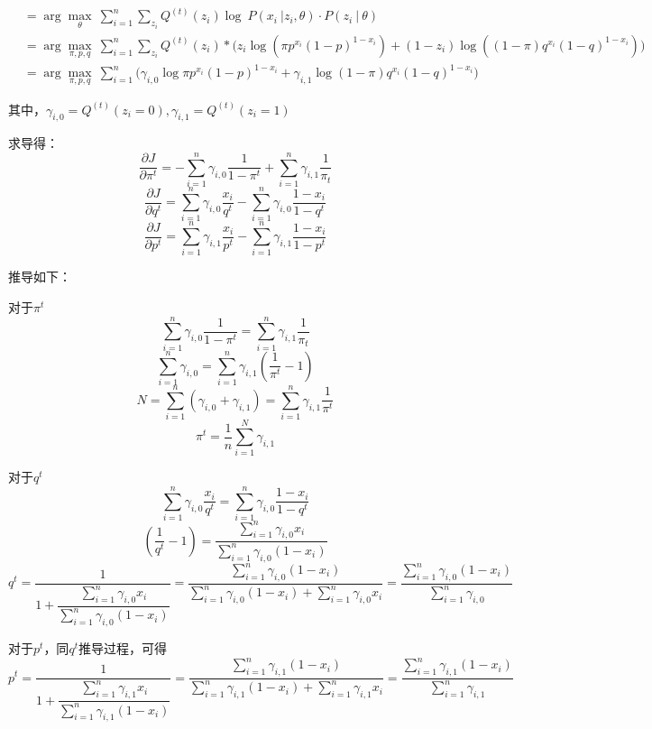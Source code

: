 \documentclass[12pt,a4paper]{article}
\begin{document}
\begin{spacing}{1.3}
\begin{equation}
\begin{split}
        & =  \arg\max\limits_{\theta} \ \sum\limits_{i=1}^{n} \sum\limits_{z_{i}}   Q^{(t)}(z_{i}) \log \ P(x_{i} \ | z_{i},\theta)·P(z_{i}\ | \ \theta) \\
        & =  \arg\max\limits_{\pi,p,q} \ \sum\limits_{i=1}^{n} \sum\limits_{z_{i}} Q^{(t)}(z_{i})    
        *\biggl(z_{i} \log (\pi p^{x_{i}}(1-p)^{1-x_{i}}) + 
        (1-z_{i})\log ((1-\pi)q^{x_{i}}(1-q)^{1-x_{i}}) \biggr) \\
        &=
        \arg\max\limits_{\pi,p,q} \ \sum\limits_{i=1}^{n} \biggl(
        \gamma_{i,0} \log \pi p^{x_{i}}(1-p)^{1-x_{i}}  + \gamma_{i,1} \log (1-\pi)q^{x_{i}}(1-q)^{1-x_{i}}   \biggr) 
        \nonumber
    \end{split}
\end{equation}
\par 其中，$\gamma_{i,0}=Q^{(t)}(z_{i}=0) , \gamma_{i,1}=Q^{(t)}(z_{i}=1)$
\par 求导得：
$$\dfrac{\partial J}{\partial \pi^{t}} = -\sum\limits_{i=1}^{n}\gamma_{i,0}\dfrac{1}{1-\pi^{t}} 
+ \sum\limits_{i=1}^{n}\gamma_{i,1}\dfrac{1}{\pi_{t}}$$
$$\dfrac{\partial J}{\partial q^{t}} =
\sum\limits_{i=1}^{n}\gamma_{i,0}\dfrac{x_{i}}{q^{t}}-\sum\limits_{i=1}^{n}\gamma_{i,0}\dfrac{1-x_{i}}{1-q^{t}} $$
$$\dfrac{\partial J}{\partial p^{t}} =
\sum\limits_{i=1}^{n}\gamma_{i,1} \dfrac{x_{i}}{p^{t}} - \sum\limits_{i=1}^{n}\gamma_{i,1}\dfrac{1-x_{i}}{1-p^{t}} $$
\par 推导如下：
\par 对于$\pi^{t}$
$$\sum\limits_{i=1}^{n}\gamma_{i,0}\dfrac{1}{1-\pi^{t}} =\sum\limits_{i=1}^{n}\gamma_{i,1}\dfrac{1}{\pi_{t}}$$
$$\sum\limits_{i=1}^{n}\gamma_{i,0} = \sum\limits_{i=1}^{n}\gamma_{i,1}(\dfrac{1}{\pi^{t}}-1) $$
$$N = \sum\limits_{i=1}^{n}(\gamma_{i,0}+\gamma_{i,1}) = \sum\limits_{i=1}^{n}\gamma_{i,1}\dfrac{1}{\pi^{t}} $$
$$\pi^{t} = \dfrac{1}{n} \sum\limits_{i=1}^{N}\gamma_{i,1}$$
\par 对于$q^{t}$
$$\sum\limits_{i=1}^{n}\gamma_{i,0} \dfrac{x_{i}}{q^{t}} = \sum\limits_{i=1}^{n}\gamma_{i,0} \dfrac{1-x_{i}}{1-q^{t}} $$
$$(\dfrac{1}{q^{t}}-1) = \dfrac{\sum\limits_{i=1}^{n}\gamma_{i,0}x_{i}}{\sum\limits_{i=1}^{n}\gamma_{i,0}(1-x_{i})} $$
$$q^{t} = \dfrac{1}{1+\dfrac{\sum\limits_{i=1}^{n}\gamma_{i,0}x_{i}}{\sum\limits_{i=1}^{n}\gamma_{i,0}(1-x_{i})}}
= \dfrac{\sum\limits_{i=1}^{n}\gamma_{i,0}(1-x_{i})} {\sum\limits_{i=1}^{n}\gamma_{i,0}(1-x_{i})+\sum\limits_{i=1}^{n}\gamma_{i,0}x_{i}}
= \dfrac{\sum\limits_{i=1}^{n}\gamma_{i,0}(1-x_{i})}{\sum\limits_{i=1}^{n}\gamma_{i,0}}$$
\par 对于$p^{t}$，同$q^{t}$推导过程，可得
$$p^{t} = \dfrac{1}{1+\dfrac{\sum\limits_{i=1}^{n}\gamma_{i,1}x_{i}}{\sum\limits_{i=1}^{n}\gamma_{i,1}(1-x_{i})}}
= \dfrac{\sum\limits_{i=1}^{n}\gamma_{i,1}(1-x_{i})} {\sum\limits_{i=1}^{n}\gamma_{i,1}(1-x_{i})+\sum\limits_{i=1}^{n}\gamma_{i,1}x_{i}}
= \dfrac{\sum\limits_{i=1}^{n}\gamma_{i,1}(1-x_{i})}{\sum\limits_{i=1}^{n}\gamma_{i,1}}$$

\end{spacing}
\end{document}
